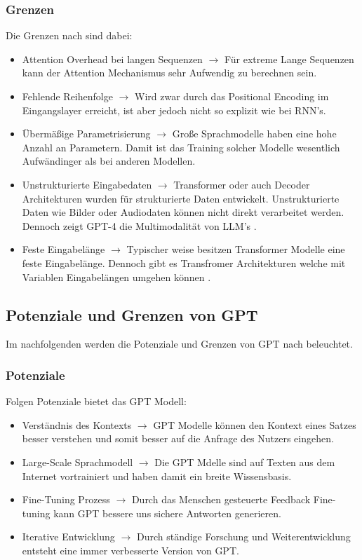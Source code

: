 \documentclass[conference]{IEEEtran}
\begin{document}
\subsubsection{Grenzen}
Die Grenzen nach \cite{kulkarniAppliedGenerativeAI2023} sind dabei:
\begin{itemize}
    \item Attention Overhead bei langen Sequenzen $\rightarrow$ Für extreme Lange Sequenzen kann der Attention Mechanismus sehr Aufwendig zu berechnen sein.
    \item Fehlende Reihenfolge $\rightarrow$ Wird zwar durch das Positional Encoding im Eingangslayer erreicht, ist aber jedoch nicht so explizit wie bei RNN's.
    \item Übermäßige Parametrisierung $\rightarrow$ Große Sprachmodelle haben eine hohe Anzahl an Parametern. Damit ist das Training solcher Modelle wesentlich Aufwändinger als bei anderen Modellen.
    \item Unstrukturierte Eingabedaten $\rightarrow$ Transformer oder auch Decoder Architekturen wurden für strukturierte Daten entwickelt. Unstrukturierte Daten wie Bilder oder Audiodaten können nicht direkt verarbeitet werden. Dennoch zeigt GPT-4 die Multimodalität von LLM's \cite{openaiGPT4TechnicalReport2024}.
    \item Feste Eingabelänge $\rightarrow$ Typischer weise besitzen Transformer Modelle eine feste Eingabelänge. Dennoch gibt es Transfromer Architekturen welche mit Variablen Eingabelängen umgehen können \cite{kulkarniChatGPTArchitectureInDepth2023}. 
\end{itemize}
\subsection{Potenziale und Grenzen von GPT}
Im nachfolgenden werden die Potenziale und Grenzen von GPT nach \cite{kulkarniChatGPTArchitectureInDepth2023} beleuchtet.
\subsubsection{Potenziale}
Folgen Potenziale bietet das GPT Modell:
\begin{itemize}
    \item Verständnis des Kontexts $\rightarrow$ GPT Modelle können den Kontext eines Satzes besser verstehen und somit besser auf die Anfrage des Nutzers eingehen.
    \item Large-Scale Sprachmodell $\rightarrow$ Die GPT Mdelle sind auf Texten aus dem Internet vortrainiert und haben damit ein breite Wissensbasis.
    \item Fine-Tuning Prozess $\rightarrow$ Durch das Menschen gesteuerte Feedback Fine-tuning kann GPT bessere uns sichere Antworten generieren.
    \item Iterative Entwicklung $\rightarrow$ Durch ständige Forschung und Weiterentwicklung entsteht eine immer verbesserte Version von GPT.
\end{itemize}
\end{document}
